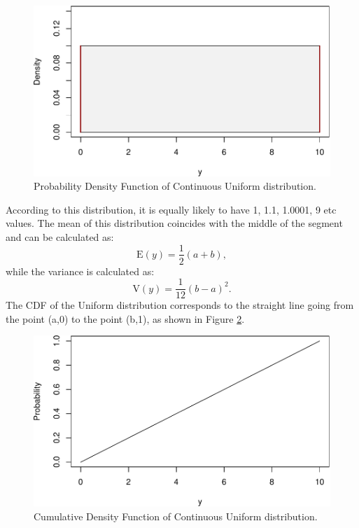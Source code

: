 \documentclass[
]{book}
\theoremstyle{definition}
\theoremstyle{definition}
\theoremstyle{definition}
\theoremstyle{definition}
\theoremstyle{remark}
\begin{document}
\begin{figure}
\centering
\includegraphics{Svetunkov---Statistics-for-Business-Analytics_files/figure-latex/uniformPDF-1.pdf}
\caption{\label{fig:uniformPDF}Probability Density Function of Continuous Uniform distribution.}
\end{figure}

According to this distribution, it is equally likely to have 1, 1.1, 1.0001, 9 etc values. The mean of this distribution coincides with the middle of the segment and can be calculated as:
\begin{equation}
    \mathrm{E}(y) = \frac{1}{2}(a+b) ,
    \label{eq:ContinuousUniformPDFMean}
\end{equation}
while the variance is calculated as:
\begin{equation}
    \mathrm{V}(y) = \frac{1}{12}(b-a)^2 .
    \label{eq:ContinuousUniformPDFVariance}
\end{equation}
The CDF of the Uniform distribution corresponds to the straight line going from the point (a,0) to the point (b,1), as shown in Figure \ref{fig:uniformCDFContinuous}.

\begin{figure}
\centering
\includegraphics{Svetunkov---Statistics-for-Business-Analytics_files/figure-latex/uniformCDFContinuous-1.pdf}
\caption{\label{fig:uniformCDFContinuous}Cumulative Density Function of Continuous Uniform distribution.}
\end{figure}
\end{document}
